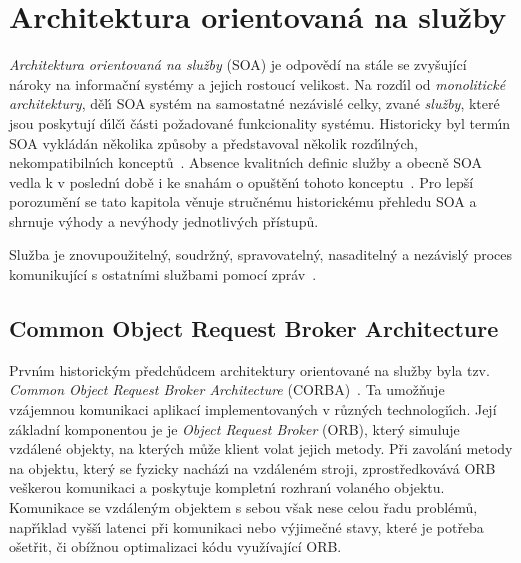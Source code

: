\section{Architektura orientovaná na služby}\label{sec:soa}

\textit{Architektura orientovaná na služby} (\gls{SOA}) je odpovědí na stále se zvyšující
nároky na informační systémy a jejich rostoucí velikost. Na rozd\'{\i}l od \textit{monolitické architektury},
děl\'{\i} \gls{SOA} systém na samostatné nezávislé celky, zvané \textit{služby}, které jsou
poskytují d\'{\i}lč\'{\i} části požadované funkcionality systému.
Historicky byl term\'{\i}n \gls{SOA} vykládán několika způsoby a představoval
několik rozd\'{\i}ln\'ych, nekompatibiln\'{\i}ch konceptů~\cite{fowler2005serviceorientedambiguity}.
Absence kvalitn\'{\i}ch definic služby a obecně \gls{SOA} vedla k v posledn\'{\i} době i ke snahám
o opuštěn\'{\i} tohoto konceptu~\cite{cerny2017disambiguation}.
Pro lepší porozumění se tato kapitola věnuje stručnému historickému přehledu \gls{SOA}
a shrnuje výhody a nevýhody jednotlivých přístupů.

\begin{definition}
    Služba je znovupoužitelný, soudržný, spravovatelný, nasaditelný a nezávislý proces komunikující
    s ostatními službami pomocí zpráv~\cite{papazoglou2003service, dragoni2017microservices}.
\end{definition}

\subsection{Common Object Request Broker Architecture}\label{sec:corba}

Prvn\'{\i}m historick\'ym předchůdcem architektury orientované na služby
byla tzv. \textit{Common Object Request Broker Architecture}
(\gls{CORBA})~\cite{siegel2000corba}. Ta umožňuje vzájemnou komunikaci aplikací
implementovan\'ych v různ\'ych technologi\'{\i}ch. Její základní komponentou je
je \textit{Object Request Broker} (\gls{ORB}), kter\'y simuluje vzdálené objekty,
na kter\'ych může klient volat jejich metody. Při zavolán\'{\i} metody
na objektu, kter\'y se fyzicky nacház\'{\i} na vzdáleném stroji,
zprostředkovává \gls{ORB} veškerou komunikaci a poskytuje kompletn\'{\i} rozhran\'{\i}
volaného objektu. Komunikace se vzdálen\'ym objektem s sebou však nese celou řadu problémů,
např\'{\i}klad vyšš\'{\i} latenci při komunikaci nebo v\'yjimečné stavy, které je potřeba
ošetřit, či obížnou optimalizaci kódu využívající \gls{ORB}.

